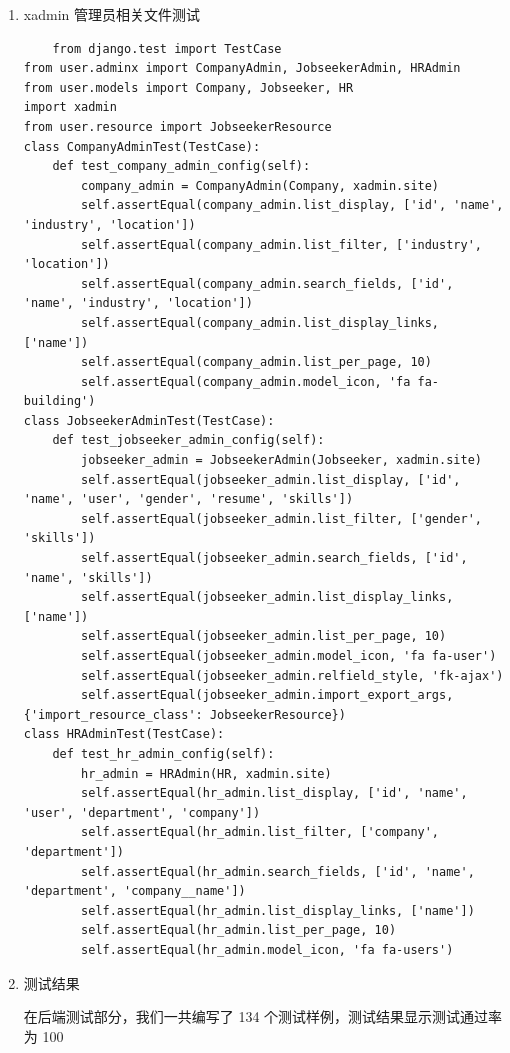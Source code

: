 \documentclass[UTF8,a4paper,10pt]{ctexart}
\begin{document}
\begin{enumerate}
\item xadmin 管理员相关文件测试
\begin{lstlisting}
    from django.test import TestCase
from user.adminx import CompanyAdmin, JobseekerAdmin, HRAdmin
from user.models import Company, Jobseeker, HR
import xadmin
from user.resource import JobseekerResource
class CompanyAdminTest(TestCase):
    def test_company_admin_config(self):
        company_admin = CompanyAdmin(Company, xadmin.site)
        self.assertEqual(company_admin.list_display, ['id', 'name', 'industry', 'location'])
        self.assertEqual(company_admin.list_filter, ['industry', 'location'])
        self.assertEqual(company_admin.search_fields, ['id', 'name', 'industry', 'location'])
        self.assertEqual(company_admin.list_display_links, ['name'])
        self.assertEqual(company_admin.list_per_page, 10)
        self.assertEqual(company_admin.model_icon, 'fa fa-building')
class JobseekerAdminTest(TestCase):
    def test_jobseeker_admin_config(self):
        jobseeker_admin = JobseekerAdmin(Jobseeker, xadmin.site)
        self.assertEqual(jobseeker_admin.list_display, ['id', 'name', 'user', 'gender', 'resume', 'skills'])
        self.assertEqual(jobseeker_admin.list_filter, ['gender', 'skills'])
        self.assertEqual(jobseeker_admin.search_fields, ['id', 'name', 'skills'])
        self.assertEqual(jobseeker_admin.list_display_links, ['name'])
        self.assertEqual(jobseeker_admin.list_per_page, 10)
        self.assertEqual(jobseeker_admin.model_icon, 'fa fa-user')
        self.assertEqual(jobseeker_admin.relfield_style, 'fk-ajax')
        self.assertEqual(jobseeker_admin.import_export_args, {'import_resource_class': JobseekerResource})
class HRAdminTest(TestCase):
    def test_hr_admin_config(self):
        hr_admin = HRAdmin(HR, xadmin.site)
        self.assertEqual(hr_admin.list_display, ['id', 'name', 'user', 'department', 'company'])
        self.assertEqual(hr_admin.list_filter, ['company', 'department'])
        self.assertEqual(hr_admin.search_fields, ['id', 'name', 'department', 'company__name'])
        self.assertEqual(hr_admin.list_display_links, ['name'])
        self.assertEqual(hr_admin.list_per_page, 10)
        self.assertEqual(hr_admin.model_icon, 'fa fa-users')
\end{lstlisting}
\item 测试结果
\par\hspace{2em} 在后端测试部分，我们一共编写了 134 个测试样例，测试结果显示测试通过率为
100%
\end{enumerate}
\end{document}

